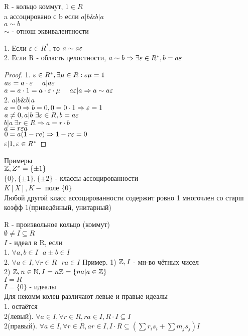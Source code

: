 R - кольцо коммут, $ 1 \in R $ \\
a ассоцировано с b если $ a | b \& b | a $ \\
$ a \sim b $\\
$ \sim $ - отнош эквивалентности \\
\begin{theorem}
	1. Если $ \varepsilon \in R^* $, то $ a \sim a\varepsilon $\\
	2. Если R - область целостности, $ a \sim b \Rightarrow \exists \varepsilon \in R^*, b = a\varepsilon $
	\begin{proof}
		1. $ \varepsilon \in R^*, \exists \mu \in R : \varepsilon \mu = 1 $ \\
		$ a \varepsilon = a \cdot \varepsilon  \ \ \ \ a | a\varepsilon $ \\
		$ a = a \cdot 1 = a \cdot \eps \cdot \mu  \ \  \ \ a\eps | a \Rightarrow a \sim a \eps $\\
		2. $ a | b \& b | a $ \\
		$ a = 0 \Rightarrow b = 0, 0 = 0 \cdot 1 \Rightarrow \varepsilon = 1	$ \\
		$ a \neq 0, a | b \ \exists \varepsilon \in R, b = a\varepsilon $ \\
		$ b | a \ \exists r \in R \Rightarrow a = r \cdot b $ \\
		$ a = r \varepsilon a  $ \\
		$ 0 = a (1 - re) \Rightarrow 1 - r \varepsilon = 0 $ \\
		$ \varepsilon | 1, \varepsilon \in R^* $
	\end{proof}
\end{theorem}
Примеры \\
$ \mathbb{Z}, Z^* = \{\pm 1 \}$ \\
$ \{0\}, \{\pm 1\}, \{ \pm 2 \} $ - классы ассоцированности \\
$ K[X], K - $ поле $ \{0\} $ \\
Любой другой класс ассоцированности содержит ровно 1 многочлен со старш коэфф 1(приведённый, унитарный) \\


R - произвольное кольцо (коммут)\\ %
$ \emptyset \neq I \subseteq R$ \\
$ I $ - идеал в R, если \\
1. $ \forall a,b \in I \ \ \ a \pm b \in I $ \\
2. $ \forall a \in I, \forall r \in R  \ \ \ ra \in I $ 
Пример. 1) $ \mathbb{Z}, I $ - мн-во чётных чисел \\
2) $ \mathbb{Z}, n \in \mathbb{N}, I = n\mathbb{Z} = \{ na | a \in \mathbb{Z}  \} $ \\
$I = R$ \\
$ I = \{0\} $ - идеалы \\ 
Для некомм колец различают левые и правые идеалы \\
1. остаётся \\
2(левый). $ \forall a \in I, \forall r \in R, ra \in I, R\cdot I \subseteq I $ \\ 2(правый). $ \forall a \in I, \forall r \in R, ar \in I,  I \cdot R \subseteq  (\sum r_is_i + \sum m_js_j)I $ \\

